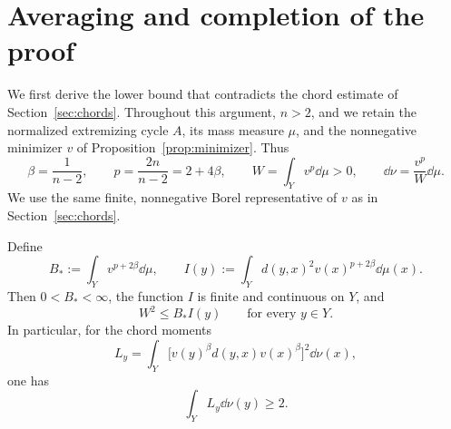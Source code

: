 \section{Averaging and completion of the proof}
\label{sec:conclusion}

We first derive the lower bound that contradicts the chord estimate of
Section~\ref{sec:chords}. Throughout this argument, \(n>2\), and we retain
the normalized extremizing cycle \(A\), its mass measure \(\mu\), and the
nonnegative minimizer \(v\) of Proposition~\ref{prop:minimizer}. Thus
\[
 \beta=\frac1{n-2},\qquad p=\frac{2n}{n-2}=2+4\beta,
 \qquad W=\int_Y v^p\dd\mu>0,
 \qquad \dd\nu=\frac{v^p}{W}\dd\mu.
\]
We use the same finite, nonnegative Borel representative of \(v\) as in
Section~\ref{sec:chords}.

\begin{lemma}
\label{lem:opposite-average}
Define
\begin{equation}
 \label{finish:weighted-moment}
 B_*:=\int_Y v^{p+2\beta}\dd\mu,
 \qquad
 I(y):=\int_Y d(y,x)^2v(x)^{p+2\beta}\dd\mu(x).
\end{equation}
Then \(0<B_*<\infty\), the function \(I\) is finite and continuous on
\(Y\), and
\begin{equation}
 \label{finish:all-centers}
 W^2\le B_*I(y)\qquad\text{for every }y\in Y.
\end{equation}
In particular, for the chord moments
\[
 L_y=\int_Y
       \bigl[v(y)^\beta d(y,x)v(x)^\beta\bigr]^2\dd\nu(x),
\]
one has
\begin{equation}
 \label{finish:opposite-average}
 \int_Y L_y\dd\nu(y)\ge2.
\end{equation}
\end{lemma}

